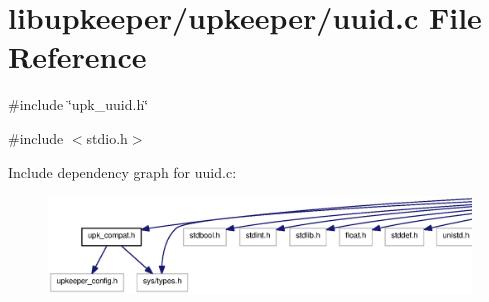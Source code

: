 \section{libupkeeper/upkeeper/uuid.c File Reference}
\label{upkeeper_2uuid_8c}
{\ttfamily \#include \char`\"{}upk\_\-uuid.h\char`\"{}}\par
{\ttfamily \#include $<$stdio.h$>$}\par
Include dependency graph for uuid.c:
\nopagebreak
\begin{figure}[H]
\begin{center}
\leavevmode
\includegraphics[width=400pt]{upkeeper_2uuid_8c__incl}
\end{center}
\end{figure}
